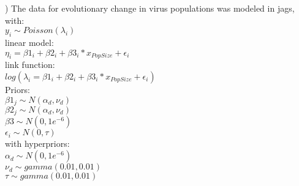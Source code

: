 \documentclass[letterpaper, 12pt]{article}
\begin{document}
) The data for evolutionary change in virus populations was modeled in jags, with: \\
	\indent	$y_{i} \sim Poisson(\lambda_{i})$ \\
linear model:\\
	\indent $ \eta_{i} = \beta1_{i} + \beta2_{i}  + \beta3_{i} * x_{PopSize} + \epsilon_{i}$\\
link function: \\
	\indent $ log(\lambda_{i} = \beta1_{i} + \beta2_{i}  + \beta3_{i} * x_{PopSize} + \epsilon_{i}) $\\

\noindent Priors:\\
	\indent $ \beta1_{j} \sim N(\alpha_{d}, \nu_{d})$\\
	\indent $ \beta2_{j} \sim N(\alpha_{d}, \nu_{d})$\\
	\indent $ \beta3 \sim N(0, 1e^{-6})$\\
	\indent $ \epsilon_{i} \sim N(0, \tau) $\\
		
\noindent with hyperpriors:\\
	\indent $\alpha_{d} \sim N(0, 1e^{-6})$\\
	\indent $ \nu_{d} \sim gamma(0.01, 0.01) $\\
	\indent $ \tau \sim gamma(0.01, 0.01)$\\ 
	
\end{document}
